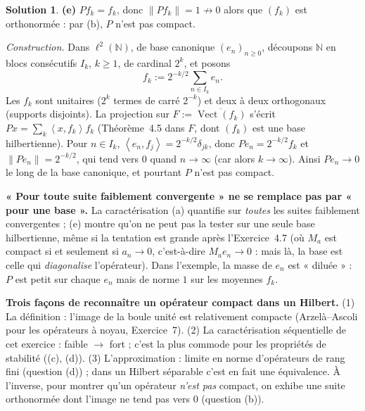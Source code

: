 \documentclass[11pt,a4paper]{article}
\newcommand{\N}{\mathbb{N}}
\newcommand{\adh}[1]{\overline{#1}}
\newcommand{\Vect}{\operatorname{Vect}}
\newcommand{\norm}[1]{\left\|#1\right\|}
\newcommand{\ps}[2]{\left\langle #1,#2\right\rangle}
\theoremstyle{definition}
\newtheorem*{solution}{Solution}
\begin{document}
\begin{solution}
\medskip
\noindent\textbf{(e)} $Pf_k=f_k$, donc $\norm{Pf_k}=1\not\to0$ alors que $(f_k)$ est orthonormée : par (b), $P$ n'est pas compact.

\emph{Construction.} Dans $\ell^2(\N)$, de base canonique $(e_n)_{n\ge0}$, découpons $\N$ en blocs consécutifs $I_k$, $k\ge1$, de cardinal $2^k$, et posons
\[
f_k:=2^{-k/2}\sum_{n\in I_k}e_n .
\]
Les $f_k$ sont unitaires ($2^k$ termes de carré $2^{-k}$) et deux à deux orthogonaux (supports disjoints). La projection sur $F:=\adh{\Vect(f_k)}$ s'écrit $Px=\sum_k\ps x{f_k}f_k$ (Théorème~4.5 dans $F$, dont $(f_k)$ est une base hilbertienne). Pour $n\in I_k$, $\ps{e_n}{f_j}=2^{-k/2}\delta_{jk}$, donc $Pe_n=2^{-k/2}f_k$ et $\norm{Pe_n}=2^{-k/2}$, qui tend vers $0$ quand $n\to\infty$ (car alors $k\to\infty$). Ainsi $Pe_n\to0$ le long de la base canonique, et pourtant $P$ n'est pas compact.
\end{solution}

\begin{piege}
\textbf{« Pour toute suite faiblement convergente » ne se remplace pas par « pour une base ».} La caractérisation (a) quantifie sur \emph{toutes} les suites faiblement convergentes ; (e) montre qu'on ne peut pas la tester sur une seule base hilbertienne, même si la tentation est grande après l'Exercice~4.7 (où $M_a$ est compact si et seulement si $a_n\to0$, c'est-à-dire $M_ae_n\to0$ : mais là, la base est celle qui \emph{diagonalise} l'opérateur). Dans l'exemple, la masse de $e_n$ est « diluée » : $P$ est petit sur chaque $e_n$ mais de norme $1$ sur les moyennes $f_k$.
\end{piege}

\begin{pointcle}
\textbf{Trois façons de reconnaître un opérateur compact dans un Hilbert.} (1) La définition : l'image de la boule unité est relativement compacte (Arzelà--Ascoli pour les opérateurs à noyau, Exercice~7). (2) La caractérisation séquentielle de cet exercice : faible $\to$ fort ; c'est la plus commode pour les propriétés de stabilité ((c), (d)). (3) L'approximation : limite en norme d'opérateurs de rang fini (question (d)) ; dans un Hilbert séparable c'est en fait une équivalence. À l'inverse, pour montrer qu'un opérateur \emph{n'est pas} compact, on exhibe une suite orthonormée dont l'image ne tend pas vers $0$ (question (b)).
\end{pointcle}
\end{document}
